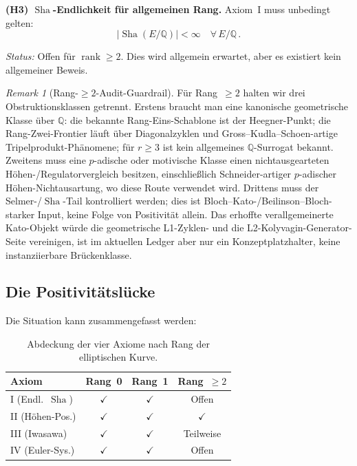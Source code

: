 \documentclass[aps,prd,twocolumn,superscriptaddress,nofootinbib,floatfix]{revtex4-2}
\theoremstyle{definition}
\theoremstyle{remark}
\newtheorem{remark}[theorem]{Remark}
\DeclareMathOperator{\rank}{rank}
\DeclareMathOperator{\Sha}{Sha}
\begin{document}
\textbf{(H3) $\Sha$-Endlichkeit für allgemeinen Rang.} Axiom~I muss unbedingt gelten:
\begin{equation}
|\Sha(E/\mathbb{Q})| < \infty \quad \forall\, E/\mathbb{Q}\,.
\end{equation}

\textit{Status:} Offen für $\rank \geq 2$. Dies wird allgemein erwartet, aber es existiert kein allgemeiner Beweis.

\begin{remark}[Rang-$\geq2$-Audit-Guardrail]
\label{rem:rank-ge2-audit-guardrail}
Für Rang~$\geq2$ halten wir drei Obstruktionsklassen getrennt. Erstens braucht man eine kanonische geometrische Klasse über $\mathbb{Q}$: die bekannte Rang-Eins-Schablone ist der Heegner-Punkt; die Rang-Zwei-Frontier läuft über Diagonalzyklen und Gross--Kudla--Schoen-artige Tripelprodukt-Phänomene; für $r\geq3$ ist kein allgemeines $\mathbb{Q}$-Surrogat bekannt. Zweitens muss eine $p$-adische oder motivische Klasse einen nichtausgearteten Höhen-/Regulatorvergleich besitzen, einschließlich Schneider-artiger $p$-adischer Höhen-Nichtausartung, wo diese Route verwendet wird. Drittens muss der Selmer-/$\Sha$-Tail kontrolliert werden; dies ist Bloch--Kato-/Beilinson--Bloch-starker Input, keine Folge von Positivität allein. Das erhoffte verallgemeinerte Kato-Objekt würde die geometrische L1-Zyklen- und die L2-Kolyvagin-Generator-Seite vereinigen, ist im aktuellen Ledger aber nur ein Konzeptplatzhalter, keine instanziierbare Brückenklasse.
\end{remark}

\subsection{Die Positivitätslücke}

Die Situation kann zusammengefasst werden:

\begin{table}[htbp]
\centering
\caption{Abdeckung der vier Axiome nach Rang der elliptischen Kurve.}
\label{tab:axiom_coverage}
\begin{tabular*}{\columnwidth}{@{\extracolsep{\fill}}lccc@{}}
\toprule
\textbf{Axiom} & \textbf{Rang~0} & \textbf{Rang~1} & \textbf{Rang~$\geq 2$} \\
\midrule
I (Endl.\ $\Sha$) & $\checkmark$ & $\checkmark$ & Offen \\
\addlinespace
II (Höhen-Pos.) & $\checkmark$ & $\checkmark$ & $\checkmark$ \\
\addlinespace
III (Iwasawa) & $\checkmark$ & $\checkmark$ & Teilweise \\
\addlinespace
IV (Euler-Sys.) & $\checkmark$ & $\checkmark$ & Offen \\
\bottomrule
\end{tabular*}
\end{table}
\end{document}
